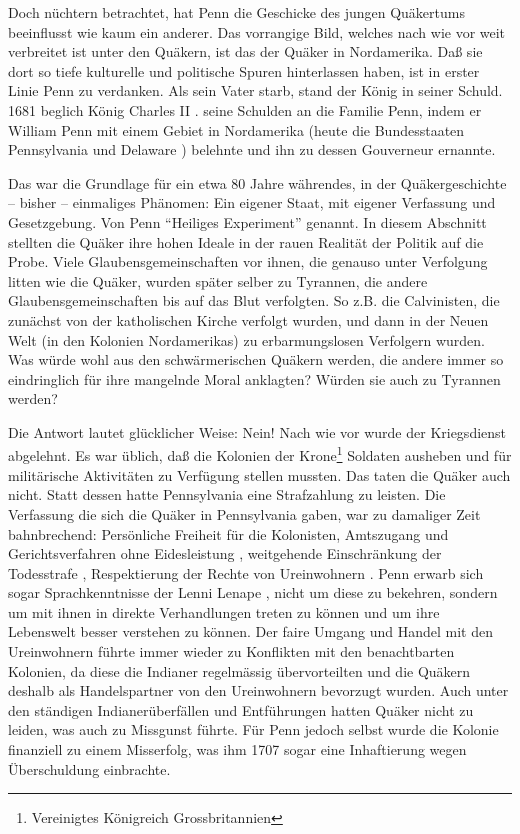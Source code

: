 \medskip

Doch nüchtern betrachtet, hat Penn die Geschicke des jungen Quäkertums
beeinflusst wie kaum  ein anderer. Das vorrangige Bild, welches nach wie vor weit
verbreitet ist unter den Quäkern, ist das der Quäker in Nordamerika. Daß sie
dort so tiefe kulturelle und politische Spuren hinterlassen haben, ist in erster
Linie Penn zu verdanken. Als sein Vater starb, stand der König in seiner Schuld.
1681 beglich König Charles II . seine
Schulden  an die Familie Penn, indem er William Penn mit einem
Gebiet in Nordamerika (heute die Bundesstaaten Pennsylvania
 und Delaware ) belehnte und ihn
zu dessen Gouverneur ernannte.

\medskip

Das war die Grundlage für ein etwa 80 Jahre währendes, in der Quäkergeschichte
-- bisher -- einmaliges Phänomen: Ein eigener Staat, mit eigener Verfassung und
Gesetzgebung. Von Penn "`Heiliges Experiment"' genannt. In diesem Abschnitt
stellten die Quäker ihre hohen Ideale in der rauen Realität der Politik auf die
Probe. Viele Glaubensgemeinschaften vor ihnen, die genauso unter Verfolgung
litten wie die Quäker, wurden später selber zu Tyrannen, die andere
Glaubensgemeinschaften bis auf das Blut verfolgten. So z.B. die
Calvinisten, die zunächst von der katholischen
Kirche verfolgt wurden, und dann in der Neuen Welt (in den Kolonien
Nordamerikas) zu erbarmungslosen Verfolgern wurden. Was würde wohl aus den
schwärmerischen Quäkern werden, die andere immer so eindringlich für ihre
mangelnde Moral anklagten? Würden sie auch zu Tyrannen werden?

\medskip

Die Antwort lautet glücklicher Weise: Nein! Nach wie vor wurde der Kriegsdienst
abgelehnt. Es war üblich, daß die Kolonien der Krone\footnote{Vereinigtes
Königreich Grossbritannien} Soldaten ausheben und für militärische
Aktivitäten zu Verfügung stellen mussten. Das taten die Quäker auch nicht. Statt
dessen hatte Pennsylvania eine Strafzahlung zu leisten. Die Verfassung die sich
die Quäker in Pennsylvania gaben, war zu damaliger Zeit bahnbrechend: Persönliche
Freiheit für die Kolonisten, Amtszugang und Gerichtsverfahren ohne
Eidesleistung , weitgehende Einschränkung der Todesstrafe
, Respektierung der Rechte von Ureinwohnern
. Penn erwarb sich sogar Sprachkenntnisse
 der Lenni Lenape , nicht
um diese zu bekehren, sondern um mit ihnen in direkte Verhandlungen treten zu
können und um ihre Lebenswelt besser verstehen zu können. Der faire Umgang und
Handel mit den Ureinwohnern führte immer wieder zu Konflikten mit den
benachtbarten Kolonien, da diese die Indianer regelmässig übervorteilten und
die Quäkern deshalb als Handelspartner von den Ureinwohnern bevorzugt wurden.
Auch unter den ständigen Indianerüberfällen und Entführungen
hatten Quäker nicht zu leiden, was auch zu Missgunst führte. Für Penn jedoch
selbst wurde die Kolonie finanziell zu einem Misserfolg, was ihm 1707 sogar eine
Inhaftierung  wegen Überschuldung einbrachte.

